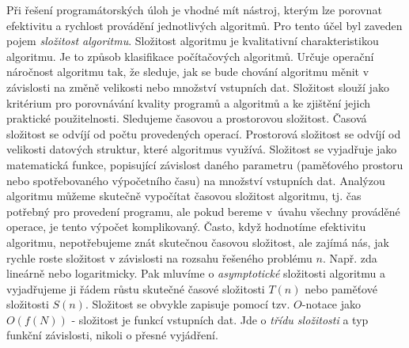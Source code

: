 \documentclass[12pt]{article}
\begin{document}
Při řešení programátorských úloh je vhodné mít nástroj, kterým lze porovnat efektivitu a rychlost provádění jednotlivých algoritmů. Pro tento účel byl zaveden pojem \textit{složitost algoritmu}.
\newline
\indent
Složitost algoritmu je kvalitativní charakteristikou algoritmu. Je to způsob klasifikace počítačových algoritmů. Určuje operační náročnost algoritmu tak, že sleduje, jak se bude chování algoritmu měnit v závislosti na změně velikosti nebo množství vstupních dat. Složitost slouží jako kritérium pro porovnávání kvality programů a algoritmů a ke zjištění jejich praktické použitelnosti.
\newline
\indent
Sledujeme časovou a prostorovou složitost. Časová složitost se odvíjí od počtu provedených operací. Prostorová složitost se odvíjí od velikosti datových struktur, které algoritmus využívá. Složitost se vyjadřuje jako matematická funkce, popisující závislost daného parametru (paměťového prostoru nebo spotřebovaného výpočetního času) na množství vstupních dat. \citep{rybicka}
\newline
\indent
Analýzou algoritmu můžeme skutečně vypočítat časovou složitost algoritmu, tj. čas potřebný pro provedení programu, ale pokud bereme v~úvahu všechny prováděné operace, je tento výpočet komplikovaný. Často, když hodnotíme efektivitu algoritmu, nepotřebujeme znát skutečnou časovou složitost, ale zajímá nás, jak rychle roste složitost v závislosti na rozsahu řešeného problému $n$. Např. zda lineárně nebo logaritmicky. Pak mluvíme o \textit{asymptotické} složitosti algoritmu a vyjadřujeme ji řádem růstu skutečné časové složitosti $T(n)$ nebo paměťové složitosti $S(n)$. \citep{hudec}
\newline
\indent
Složitost se obvykle zapisuje pomocí tzv. $O$-notace jako $O(f(N))$ - složitost je funkcí vstupních dat. Jde o \textit{třídu složitosti} a typ funkční závislosti, nikoli o přesné vyjádření.
\end{document}
